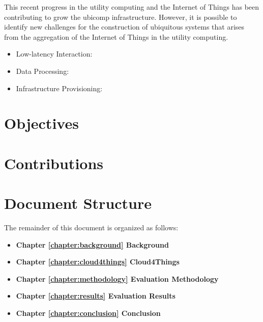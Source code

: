 This recent progress in the utility computing and the Internet of Things has been contributing to grow the
\gls{ubicomp} infrastructure. However, it is possible to identify new challenges for the construction
of ubiquitous systems that arises from the aggregation of the Internet of Things in the utility
computing.

\begin{itemize}
  \item Low-latency Interaction:
  \item Data Processing:
  \item Infrastructure Provisioning:
\end{itemize}

\section{Objectives}
\label{section:objectives}


\section{Contributions}
\label{scction:contributions}

\section{Document Structure}
\label{section:structure}
The remainder of this document is organized as follows:
\begin{itemize}
  \item \textbf{Chapter \ref{chapter:background} Background}
  \item \textbf{Chapter \ref{chapter:cloud4things} Cloud4Things}
  \item \textbf{Chapter \ref{chapter:methodology} Evaluation Methodology}
  \item \textbf{Chapter \ref{chapter:results} Evaluation Results}
  \item \textbf{Chapter \ref{chapter:conclusion} Conclusion}
\end{itemize}
